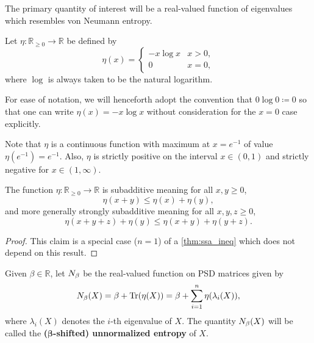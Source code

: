 \documentclass[notitlepage, 10pt]{article}
\begin{document}
The primary quantity of interest will be a real-valued function of eigenvalues which resembles von Neumann entropy.
\begin{defn}
    Let $\eta : \mathbb R_{\geq 0} \to \mathbb R$ be defined by
    \begin{equation}
        \eta (x) = 
        \begin{cases}
            - x \log x & x > 0, \\
            0 & x = 0,
        \end{cases}
    \end{equation}
    where $\log$ is always taken to be the natural logarithm. 
\end{defn}
\begin{rem}
    For ease of notation, we will henceforth adopt the convention that $0\log 0 \coloneqq 0$ so that one can write $\eta(x) = - x \log x$ without consideration for the $x = 0$ case explicitly.
\end{rem}
\begin{rem}
    Note that $\eta$ is a continuous function with maximum at $x = e^{-1}$ of value $\eta(e^{-1}) = e^{-1}$.
    Also, $\eta$ is strictly positive on the interval $x \in (0,1)$ and strictly negative for $x \in (1, \infty)$.
\end{rem}
\begin{lem}
    The function $\eta : \mathbb R_{\geq 0} \to \mathbb R$ is subadditive meaning for all $x,y \geq 0$,
    \begin{equation}
        \eta(x+y)\leq \eta(x) + \eta(y),
    \end{equation}
    and more generally strongly subadditive meaning for all $x,y,z\geq0$,
    \begin{equation}
        \eta(x+y+z)+\eta(y)\leq \eta(x+y) + \eta(y+z).
    \end{equation}
\end{lem}
\begin{proof}
    This claim is a special case ($n=1$) of a \cref{thm:ssa_ineq} which does not depend on this result.
\end{proof}
\begin{defn}
    Given $\beta \in \mathbb R$, let $N_{\beta}$ be the real-valued function on PSD matrices given by
    \begin{equation}
        \label{eq:shifted_unnormalized_entropy}
        N_{\beta}(X) = \beta + \operatorname{Tr}(\eta(X)) = \beta + \sum_{i=1}^{n} \eta(\lambda_i(X)),
    \end{equation}
    where $\lambda_i(X)$ denotes the $i$-th eigenvalue of $X$.
    The quantity $N_{\beta}(X)$ will be called the \textbf{($\boldsymbol{\beta}$-shifted) unnormalized entropy} of $X$. 
\end{defn}
\end{document}
